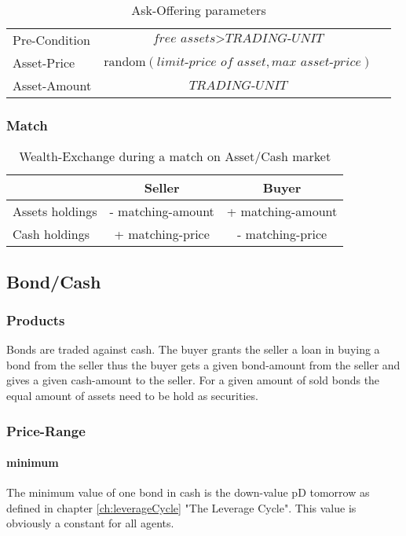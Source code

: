 \documentclass[Bachelorarbeit.tex]{subfiles}
\begin{document}
\begin{table}[H]
	\centering
	\caption{Ask-Offering parameters}
	\begin{tabular} { l c r }
		\hline
		Pre-Condition & $\textit{free assets} > \textit{TRADING-UNIT}$  \\
		Asset-Price & $\mathrm{random}(\textit{limit-price of asset}, \textit{max asset-price})$ \\
		Asset-Amount & $\textit{TRADING-UNIT}$ \\
		\hline
	\end{tabular}
\end{table}


\subsubsection{Match}

\begin{table}[H]
	\centering
	\caption{Wealth-Exchange during a match on Asset/Cash market}
	\begin{tabular} { l c c }
		& Seller & Buyer \\
		\hline
		Assets holdings & - matching-amount & + matching-amount \\
		Cash holdings  & + matching-price & - matching-price \\
		\hline
	\end{tabular}
\end{table}

\subsection{Bond/Cash}
\subsubsection{Products}
Bonds are traded against cash. The buyer grants the seller a loan in buying a bond from the seller thus the buyer gets a given bond-amount from the seller and gives a given cash-amount to the seller. For a given amount of sold bonds the equal amount of assets need to be hold as securities.

\subsubsection{Price-Range}

\paragraph{minimum}
The minimum value of one bond in cash is the down-value pD tomorrow as defined in chapter \ref{ch:leverageCycle} "The Leverage Cycle". This value is obviously a constant for all agents.
\end{document}
